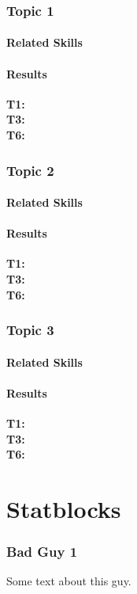 \documentclass{ShadowTeXSR5}
\begin{document}
\subsection{Topic 1}
\lipsum[1]
\subsubsection{Related Skills}
\lipsum[1]
\subsubsection{Results}
\textbf{T1:}\\
\textbf{T3:}\\
\textbf{T6:}\\

\subsection{Topic 2}
\lipsum[1]
\subsubsection{Related Skills}
\lipsum[1]
\subsubsection{Results}
\lipsum[1]
\textbf{T1:}\\
\textbf{T3:}\\
\textbf{T6:}\\

\subsection{Topic 3}
\lipsum[1]
\subsubsection{Related Skills}
\lipsum[1]
\subsubsection{Results}
\lipsum[1]
\textbf{T1:}\\
\textbf{T3:}\\
\textbf{T6:}\\


\chapter{Statblocks}
\subsection{Bad Guy 1}
Some text about this guy.
\end{document}
